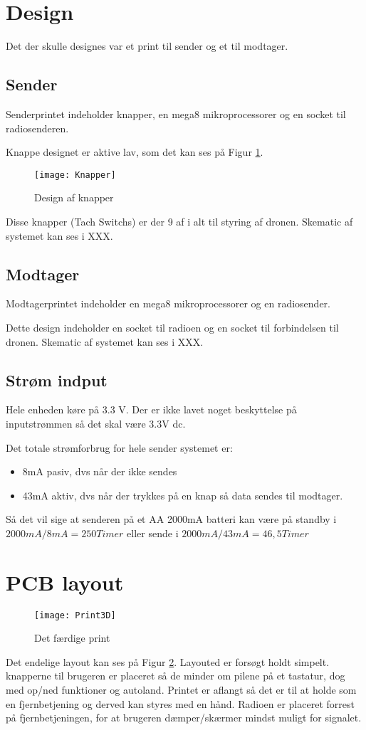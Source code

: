 \documentclass[Main]{subfiles}
\begin{document}
\section{Design}
Det der skulle designes var
et print til sender og et til modtager.

\subsection{Sender}
Senderprintet indeholder knapper, en mega8 mikroprocessorer og en socket til radiosenderen.

Knappe designet er aktive lav, som det kan ses på Figur \ref{fig: Knapper}.


\begin{figure}[H]
\centering
\texttt{[image: Knapper]}
\caption{Design af knapper}
\label{fig: Knapper}
\end{figure}

Disse knapper (Tach Switchs) er der 9 af i alt til styring af dronen.
Skematic af systemet kan ses i XXX.
\subsection{Modtager}
Modtagerprintet indeholder en mega8 mikroprocessorer og en radiosender.

Dette design indeholder en socket til radioen og en socket til \itoc forbindelsen til dronen.
Skematic af systemet kan ses i XXX.


\subsection{Strøm indput}

Hele enheden køre på 3.3 V.
Der er ikke lavet noget beskyttelse på inputstrømmen så det skal være 3.3V dc.

Det totale strømforbrug for hele sender systemet er:
\begin{itemize}
\item 8mA pasiv, dvs når der ikke sendes
\item 43mA aktiv, dvs når der trykkes på en knap så data sendes til modtager.
\end{itemize}

Så det vil sige at senderen på et AA 2000mA batteri kan være på standby i $2000mA/8mA = 250 Timer$ eller sende i $2000mA/43mA = 46,5 Timer$


\section{PCB layout}

\begin{figure}[H]
\centering
\texttt{[image: Print3D]}
\caption{Det færdige print}
\label{fig: Print3D}
\end{figure}
Det endelige layout kan ses på Figur \ref{fig: Print3D}.
Layouted er forsøgt holdt simpelt. knapperne til brugeren er placeret så de minder om pilene på et tastatur, dog med op/ned funktioner og autoland.
Printet er aflangt så det er til at holde som en fjernbetjening og derved kan styres med en hånd.
Radioen er placeret forrest på fjernbetjeningen, for at brugeren dæmper/skærmer mindst muligt for signalet.  
\end{document}
